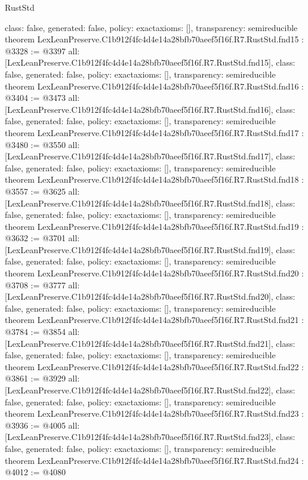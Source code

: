 \begin{lexlean}{RustStd}
\begin{coremodule}
{  class: false,
  generated: false,
  policy: exact{axioms: []},
  transparency: semireducible
}
theorem LexLeanPreserve.C1b912f4fc4d4e14a28bfb70aeef5f16f.R7.RustStd.fnd15 : @3328 := @3397 {
  all: [LexLeanPreserve.C1b912f4fc4d4e14a28bfb70aeef5f16f.R7.RustStd.fnd15],
  class: false,
  generated: false,
  policy: exact{axioms: []},
  transparency: semireducible
}
theorem LexLeanPreserve.C1b912f4fc4d4e14a28bfb70aeef5f16f.R7.RustStd.fnd16 : @3404 := @3473 {
  all: [LexLeanPreserve.C1b912f4fc4d4e14a28bfb70aeef5f16f.R7.RustStd.fnd16],
  class: false,
  generated: false,
  policy: exact{axioms: []},
  transparency: semireducible
}
theorem LexLeanPreserve.C1b912f4fc4d4e14a28bfb70aeef5f16f.R7.RustStd.fnd17 : @3480 := @3550 {
  all: [LexLeanPreserve.C1b912f4fc4d4e14a28bfb70aeef5f16f.R7.RustStd.fnd17],
  class: false,
  generated: false,
  policy: exact{axioms: []},
  transparency: semireducible
}
theorem LexLeanPreserve.C1b912f4fc4d4e14a28bfb70aeef5f16f.R7.RustStd.fnd18 : @3557 := @3625 {
  all: [LexLeanPreserve.C1b912f4fc4d4e14a28bfb70aeef5f16f.R7.RustStd.fnd18],
  class: false,
  generated: false,
  policy: exact{axioms: []},
  transparency: semireducible
}
theorem LexLeanPreserve.C1b912f4fc4d4e14a28bfb70aeef5f16f.R7.RustStd.fnd19 : @3632 := @3701 {
  all: [LexLeanPreserve.C1b912f4fc4d4e14a28bfb70aeef5f16f.R7.RustStd.fnd19],
  class: false,
  generated: false,
  policy: exact{axioms: []},
  transparency: semireducible
}
theorem LexLeanPreserve.C1b912f4fc4d4e14a28bfb70aeef5f16f.R7.RustStd.fnd20 : @3708 := @3777 {
  all: [LexLeanPreserve.C1b912f4fc4d4e14a28bfb70aeef5f16f.R7.RustStd.fnd20],
  class: false,
  generated: false,
  policy: exact{axioms: []},
  transparency: semireducible
}
theorem LexLeanPreserve.C1b912f4fc4d4e14a28bfb70aeef5f16f.R7.RustStd.fnd21 : @3784 := @3854 {
  all: [LexLeanPreserve.C1b912f4fc4d4e14a28bfb70aeef5f16f.R7.RustStd.fnd21],
  class: false,
  generated: false,
  policy: exact{axioms: []},
  transparency: semireducible
}
theorem LexLeanPreserve.C1b912f4fc4d4e14a28bfb70aeef5f16f.R7.RustStd.fnd22 : @3861 := @3929 {
  all: [LexLeanPreserve.C1b912f4fc4d4e14a28bfb70aeef5f16f.R7.RustStd.fnd22],
  class: false,
  generated: false,
  policy: exact{axioms: []},
  transparency: semireducible
}
theorem LexLeanPreserve.C1b912f4fc4d4e14a28bfb70aeef5f16f.R7.RustStd.fnd23 : @3936 := @4005 {
  all: [LexLeanPreserve.C1b912f4fc4d4e14a28bfb70aeef5f16f.R7.RustStd.fnd23],
  class: false,
  generated: false,
  policy: exact{axioms: []},
  transparency: semireducible
}
theorem LexLeanPreserve.C1b912f4fc4d4e14a28bfb70aeef5f16f.R7.RustStd.fnd24 : @4012 := @4080 {
}
\end{coremodule}
\end{lexlean}

